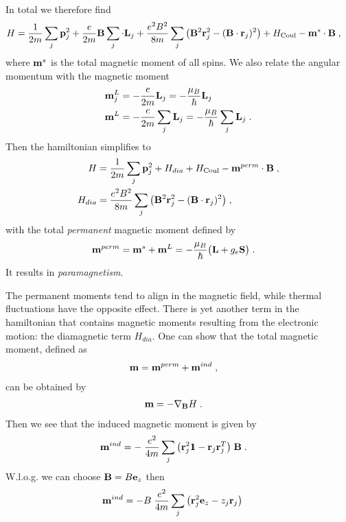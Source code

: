 In total we therefore find
%
\begin{align*}
H
&=\frac{1}{2m}\sum_{j}\mathbf p_{j}^{2} 
+\frac{e}{2m}\mathbf B \sum_{j}\cdot \mathbf L_{j} 
+\frac{e^{2}B^{2}}{8m}\sum_{j}\big(\mathbf B^{2}\mathbf r_{j}^{2}-(\mathbf B\cdot \mathbf r_{j})^{2}\big)
+ H_\text{Coul}
- \mathbf m^{s} \cdot \mathbf B\;,
\end{align*}
%
where $\mathbf m^{s}$ is the total magnetic moment of all spins. We also relate the angular momentum with the magnetic moment
%
\begin{align*}
\mathbf m^{L}_{j} &= - \frac{e}{2m} \mathbf L_{j}= - \frac{\mu_{B}}{\hbar} \mathbf L_{j}\\
\mathbf m^{L} &= - \frac{e}{2m} \sum_{j}\mathbf L_{j}= - \frac{\mu_{B}}{\hbar} \sum_{j}\mathbf L_{j}\;.
\end{align*}
%
Then the hamiltonian simplifies to 
\begin{align*}
H
&=\frac{1}{2m}\sum_{j}\mathbf p_{j}^{2} 
+ H_{dia}
+ H_\text{Coul}
- \mathbf m^{perm} \cdot \mathbf B\;,\\
H_{dia} &=
\frac{e^{2}B^{2}}{8m}\sum_{j}\big(\mathbf B^{2}\mathbf r_{j}^{2}-(\mathbf B\cdot \mathbf r_{j})^{2}\big)\;,
\end{align*}
with the total {\color{blue}\em permanent} magnetic moment defined by
%
\begin{align}
\mathbf m^{perm} &= \mathbf m^{s} + \mathbf m^{L}= -\frac{\mu_{B}}{\hbar}\big( \mathbf L + g_{e}\mathbf S \big)\;.
\end{align}
%
It results in {\color{blue}\em paramagnetism}.

The permanent moments tend to align in the magnetic field, while thermal fluctuations have  the opposite effect.
There is yet another  term in the hamiltonian  that contains magnetic moments resulting from the electronic motion: the diamagnetic term  $H_{dia}$.
One can show that the total magnetic moment, defined as
\begin{align*}
\mathbf m &= \mathbf m^{perm} + \mathbf m^{ind}\;,
\end{align*}
can be obtained by
%
\begin{align*}
\mathbf m &=- \mathbf \nabla_{\mathbf B} H\;. 
\end{align*}
%
Then we see that the induced magnetic moment is given by 
%
\begin{align*}
\mathbf m^{ind} &=-\;\frac{e^{2} }{4 m} \sum_{j} 
\big( \mathbf r_{j}^{2}1\hspace{-4pt}1  - \mathbf r_{j} \mathbf r_{j}^{T} \big)\; \mathbf B\;.
\end{align*}
%
W.l.o.g. we can choose $\mathbf B =B \mathbf e_{z}$ then
%
\begin{align*}
\mathbf m^{ind} &=-B\;\frac{e^{2} }{4 m} \sum_{j} 
\big( \mathbf r_{j}^{2}\mathbf e_{z} - z_{j} \mathbf r_{j} \big)\; 
\end{align*}
%
